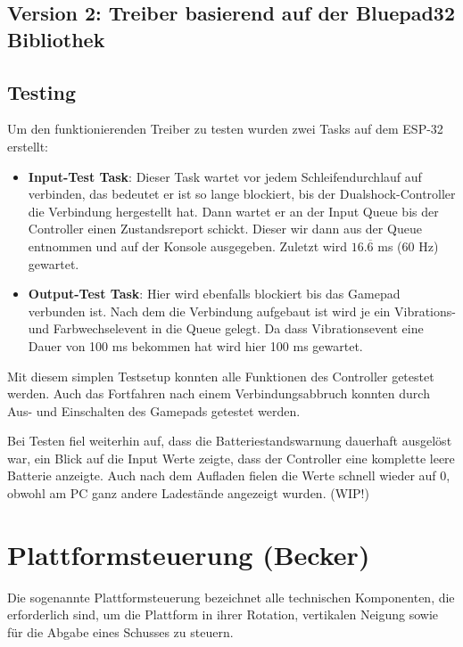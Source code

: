 \subsection{Version 2: Treiber basierend auf der Bluepad32 Bibliothek}

\subsection{Testing}

Um den funktionierenden Treiber zu testen wurden zwei Tasks auf dem ESP-32 erstellt:

\begin{itemize}
    \item \textbf{Input-Test Task}: Dieser Task wartet vor jedem Schleifendurchlauf auf verbinden, das bedeutet er ist so lange blockiert, bis der Dualshock-Controller die Verbindung hergestellt hat.
    Dann wartet er an der Input Queue bis der Controller einen Zustandsreport schickt. Dieser wir dann aus der Queue entnommen und auf der Konsole ausgegeben. Zuletzt wird $16.\overline{6}$ ms (60 Hz) gewartet.
    \item \textbf{Output-Test Task}: Hier wird ebenfalls blockiert bis das Gamepad verbunden ist. Nach dem die Verbindung aufgebaut ist wird je ein Vibrations- und Farbwechselevent in die Queue gelegt. 
    Da dass Vibrationsevent eine Dauer von 100 ms bekommen hat wird hier 100 ms gewartet.
\end{itemize}

Mit diesem simplen Testsetup konnten alle Funktionen des Controller getestet werden. 
Auch das Fortfahren nach einem Verbindungsabbruch konnten durch Aus- und Einschalten des Gamepads getestet werden. 

Bei Testen fiel weiterhin auf, dass die Batteriestandswarnung dauerhaft ausgelöst war, ein Blick auf die Input Werte zeigte, dass der Controller eine komplette leere Batterie anzeigte. 
Auch nach dem Aufladen fielen die Werte schnell wieder auf 0, obwohl am PC ganz andere Ladestände angezeigt wurden. (WIP!)

\section{Plattformsteuerung (Becker)}

Die sogenannte Plattformsteuerung bezeichnet alle technischen Komponenten, die erforderlich sind, um die Plattform in ihrer Rotation, vertikalen Neigung sowie für die Abgabe eines Schusses zu steuern.

